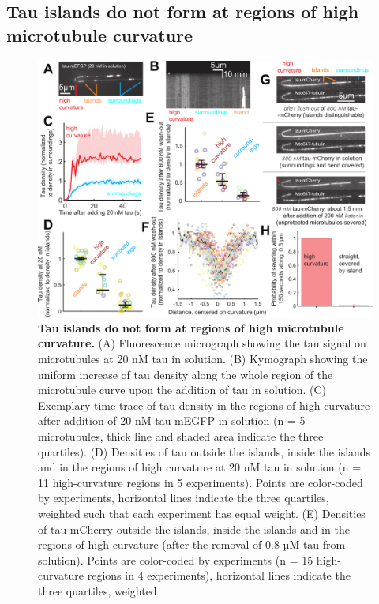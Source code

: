 \subsection{Tau islands do not form at regions of high microtubule curvature}
\begin{figure}[h!]
\centering
\includegraphics[width=1\linewidth]{Figures/taucurve.png}
\caption[Tau islands do not form at regions of high microtubule curvature.]{
\textbf{Tau islands do not form at regions of high microtubule curvature.} (A) Fluorescence micrograph showing the tau signal on microtubules at 20 nM tau in solution. (B) Kymograph showing the uniform increase of tau density along the whole region of the microtubule curve upon the addition of tau in solution. (C) Exemplary
time-trace of tau density in the regions of high curvature after addition of 20 nM tau-mEGFP in solution (n = 5 microtubules, thick line
and shaded area indicate the three quartiles). (D) Densities of tau outside the islands, inside the islands and in the regions of high curvature at 20 nM tau in solution (n = 11 high-curvature regions in 5 experiments). Points are color-coded by experiments, horizontal lines indicate the three quartiles, weighted such that each experiment has equal weight. (E) Densities of tau-mCherry
outside the islands, inside the islands and in the regions of high curvature (after the removal of 0.8 µM tau from solution). Points are
color-coded by experiments (n = 15 high-curvature regions in 4 experiments), horizontal lines indicate the three quartiles, weighted
}
\end{figure}
